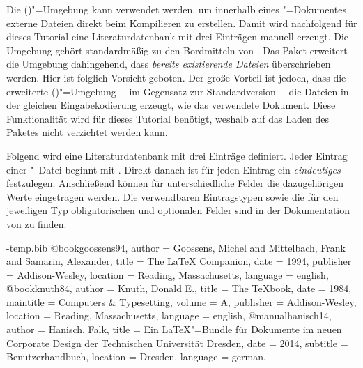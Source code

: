 \documentclass[%
  english,ngerman,%
  cdgeometry=no,DIV=12,automark%
]{tudscrartcl}
\begin{document}
Die ()"=Umgebung kann verwendet 
werden, um innerhalb eines "=Dokumentes externe Dateien direkt 
beim Kompilieren zu erstellen. Damit wird nachfolgend für dieses Tutorial eine 
Literaturdatenbank  mit drei Einträgen manuell erzeugt. 
Die Umgebung gehört standardmäßig zu den Bordmitteln von . Das 
Paket  erweitert die Umgebung dahingehend, dass 
\emph{bereits existierende Dateien} überschrieben werden. Hier ist folglich 
Vorsicht geboten. Der große Vorteil ist jedoch, dass die erweiterte 
()"=Umgebung~-- im Gegensatz 
zur Standardversion~-- die Dateien in der gleichen Eingabekodierung erzeugt, 
wie das verwendete Dokument. Diese Funktionalität wird für dieses Tutorial 
benötigt, weshalb auf das Laden des Paketes  nicht 
verzichtet werden kann. 
%
\begin{Preamble}
\usepackage{filecontents}
\end{Preamble}
%
Folgend wird eine Literaturdatenbank mit drei Einträge definiert. Jeder Eintrag 
einer "~Datei beginnt mit . Direkt 
danach ist für jeden Eintrag ein \emph{eindeutiges}  
festzulegen. Anschließend können für unterschiedliche Felder die dazugehörigen 
Werte eingetragen werden. Die verwendbaren Eintragstypen sowie die für den 
jeweiligen Typ obligatorischen und optionalen Felder sind in der Dokumentation 
von  zu finden.
%
\begin{Preamble*}
\begin{filecontents}{\jobname-temp.bib}
@book{goossens94,
  author    = {Goossens, Michel and Mittelbach, Frank
               and Samarin, Alexander},
  title     = {The LaTeX Companion},
  date      = {1994},
  publisher = {Addison-Wesley},
  location  = {Reading, Massachusetts},
  language  = {english},
}
@book{knuth84,
  author    = {Knuth, Donald E.},
  title     = {The \TeX book},
  date      = {1984},
  maintitle = {Computers \& Typesetting},
  volume    = {A},
  publisher = {Addison-Wesley},
  location  = {Reading, Massachusetts},
  language  = {english},
}
@manual{hanisch14,
  author    = {Hanisch, Falk},
  title     = {Ein \LaTeX"=Bundle für Dokumente im neuen Corporate 
               Design der Technischen Universität Dresden},
  date      = {2014},
  subtitle  = {Benutzerhandbuch},
  location  = {Dresden},
  language  = {german},
}
\end{filecontents}
\end{Preamble*}
\end{document}
